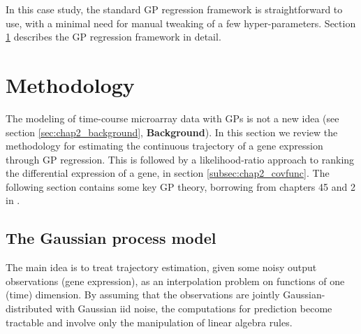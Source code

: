     In this case study, the standard GP regression framework is straightforward to use, with a
    minimal need for manual tweaking of a few hyper-parameters.
    Section \ref{sec:chap2_method} describes the GP regression framework in detail.



  \section{Methodology} \label{sec:chap2_method}
    The modeling of time-course microarray data with GPs is not a new idea
    (see section \ref{sec:chap2_background}, \textbf{Background}).
    In this section we review the methodology for estimating the continuous trajectory
    of a gene expression through GP regression. This is followed by a
    likelihood-ratio approach to ranking the differential expression of a gene, in section \ref{subsec:chap2_covfunc}.
    The following section contains some key GP theory, borrowing from chapters
    45 and 2 in \citep[respectively]{Rasmussen:book06, MacKay:book03}.

    \subsection{The Gaussian process model} \label{subsec:chap2_GPmodel}
      The main idea is to treat trajectory estimation, given some noisy output observations
      (gene expression), as an interpolation problem on functions of one (time) dimension.
      By assuming that the observations are jointly Gaussian-distributed with Gaussian iid noise, the
      computations for prediction become tractable and involve only the manipulation
      of linear algebra rules.

